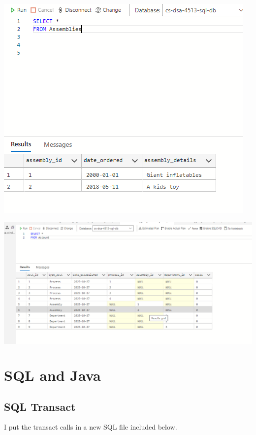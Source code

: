 \documentclass[11pt]{article}
\begin{document}
\includegraphics[width = \textwidth]{assTable.png}

\includegraphics[width = \textwidth]{accTable.png}

\section{SQL and Java}
\subsection{SQL Transact}
I put the transact calls in a new SQL file included below.
\end{document}

